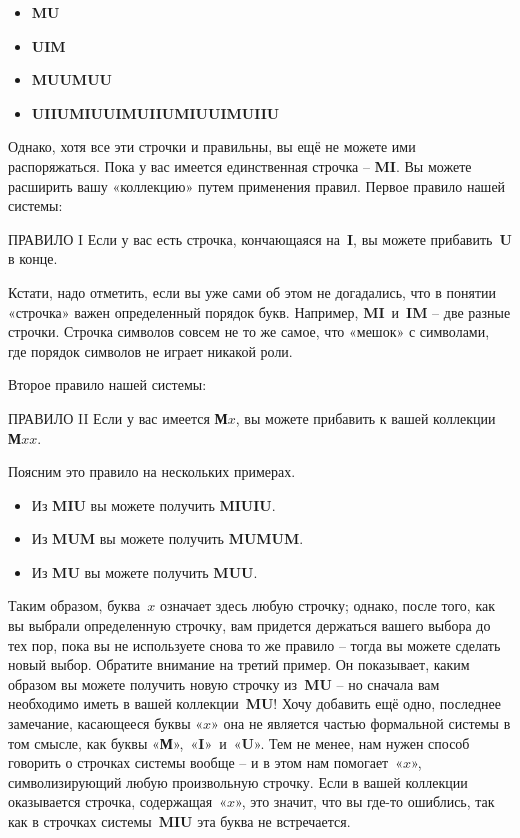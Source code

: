 \documentclass[../main.tex]{subfiles}
\begin{document}
\begin{itemize}[label={}, noitemsep, topsep=2pt, leftmargin=\parindent]
    \item \textbf{MU}
    \item \textbf{UIM}
    \item \textbf{MUUMUU}
    \item \textbf{UIIUMIUUIMUIIUMIUUIMUIIU}
\end{itemize}

Однако, хотя все эти строчки и правильны, вы ещё не можете ими распоряжаться. Пока у вас имеется единственная строчка \--- \textbf{MI}. Вы можете расширить вашу «коллекцию» путем применения правил. Первое правило нашей системы:

\begin{mybox}{ПРАВИЛО I}
    Если у вас есть строчка, кончающаяся на~\textbf{I}, вы можете прибавить~\textbf{U} в конце.
\end{mybox}

Кстати, надо отметить, если вы уже сами об этом не догадались, что в понятии «строчка» важен определенный порядок букв. Например, \textbf{MI}~и~\textbf{IM} \--- две разные строчки. Строчка символов совсем не то же самое, что «мешок» с символами, где порядок символов не играет никакой роли.

Второе правило нашей системы:

\begin{mybox}{ПРАВИЛО II}
    Если у вас имеется \textbf{М}$x$, вы можете прибавить к вашей коллекции \textbf{М}$xx$.
\end{mybox}

Поясним это правило на нескольких примерах.

\begin{itemize}[label={}, noitemsep, topsep=6pt, leftmargin=\parindent]
    \item Из \textbf{MIU} вы можете получить \textbf{MIUIU}.
    \item Из \textbf{MUM} вы можете получить \textbf{MUMUM}.
    \item Из \textbf{MU} вы можете получить \textbf{MUU}.
\end{itemize}

Таким образом, буква~$x$ означает здесь любую строчку; однако, после того, как вы выбрали определенную строчку, вам придется держаться вашего выбора до тех пор, пока вы не используете снова то же правило \--- тогда вы можете сделать новый выбор. Обратите внимание на третий пример. Он показывает, каким образом вы можете получить новую строчку из~\textbf{MU} \--- но сначала вам необходимо иметь в вашей коллекции~\textbf{MU}! Хочу добавить ещё одно, последнее замечание, касающееся буквы «$x$» она не является частью формальной системы в том смысле, как буквы «\textbf{М}»,~«\textbf{I}»~и~«\textbf{U}». Тем не менее, нам нужен способ говорить о строчках системы вообще \--- и в этом нам помогает~«$x$», символизирующий любую произвольную строчку. Если в вашей коллекции оказывается строчка, содержащая~«$x$», это значит, что вы где-то ошиблись, так как в строчках системы~\textbf{MIU} эта буква не встречается.
\end{document}
